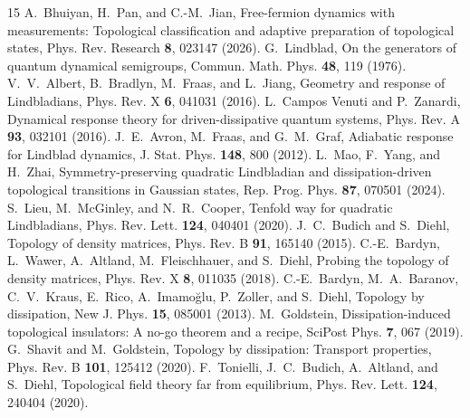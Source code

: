 \documentclass[aps,prb,twocolumn,nofootinbib,superscriptaddress,floatfix]{revtex4-2}
\begin{document}
\begin{thebibliography}{15}
A.~Bhuiyan, H.~Pan, and C.-M.~Jian,
Free-fermion dynamics with measurements: Topological classification and
adaptive preparation of topological states,
Phys. Rev. Research \textbf{8}, 023147 (2026).
G.~Lindblad, On the generators of quantum dynamical semigroups,
Commun. Math. Phys. \textbf{48}, 119 (1976).
V.~V.~Albert, B.~Bradlyn, M.~Fraas, and L.~Jiang,
Geometry and response of Lindbladians,
Phys. Rev. X \textbf{6}, 041031 (2016).
L.~Campos Venuti and P.~Zanardi,
Dynamical response theory for driven-dissipative quantum systems,
Phys. Rev. A \textbf{93}, 032101 (2016).
J.~E.~Avron, M.~Fraas, and G.~M.~Graf,
Adiabatic response for Lindblad dynamics,
J. Stat. Phys. \textbf{148}, 800 (2012).
L.~Mao, F.~Yang, and H.~Zhai,
Symmetry-preserving quadratic Lindbladian and dissipation-driven topological
transitions in Gaussian states,
Rep. Prog. Phys. \textbf{87}, 070501 (2024).
S.~Lieu, M.~McGinley, and N.~R.~Cooper,
Tenfold way for quadratic Lindbladians,
Phys. Rev. Lett. \textbf{124}, 040401 (2020).
J.~C.~Budich and S.~Diehl,
Topology of density matrices,
Phys. Rev. B \textbf{91}, 165140 (2015).
C.-E.~Bardyn, L.~Wawer, A.~Altland, M.~Fleischhauer, and S.~Diehl,
Probing the topology of density matrices,
Phys. Rev. X \textbf{8}, 011035 (2018).
C.-E.~Bardyn, M.~A.~Baranov, C.~V.~Kraus, E.~Rico, A.~Imamo\u{g}lu,
P.~Zoller, and S.~Diehl,
Topology by dissipation,
New J. Phys. \textbf{15}, 085001 (2013).
M.~Goldstein,
Dissipation-induced topological insulators: A no-go theorem and a recipe,
SciPost Phys. \textbf{7}, 067 (2019).
G.~Shavit and M.~Goldstein,
Topology by dissipation: Transport properties,
Phys. Rev. B \textbf{101}, 125412 (2020).
F.~Tonielli, J.~C.~Budich, A.~Altland, and S.~Diehl,
Topological field theory far from equilibrium,
Phys. Rev. Lett. \textbf{124}, 240404 (2020).
\end{thebibliography}
\end{document}

